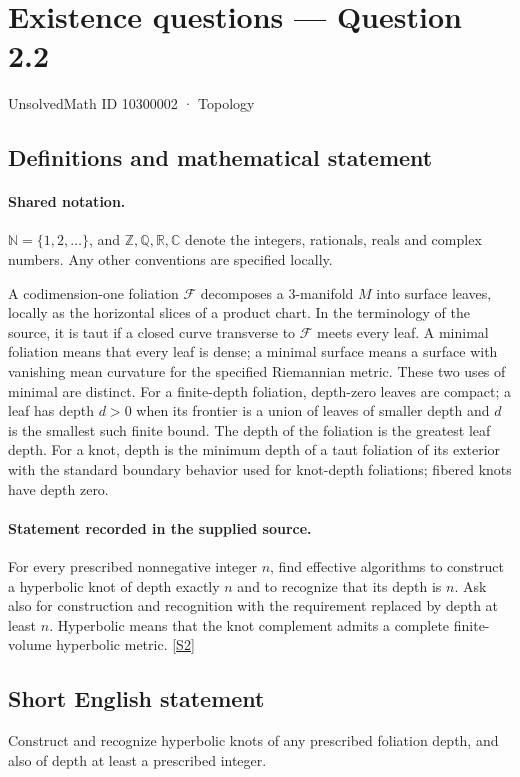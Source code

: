 \documentclass[11pt]{article}
\newcommand{\sref}[2]{\hyperlink{source:#1:#2}{[S#2]}}
\begin{document}
\setcounter{section}{10300001}
\section{Existence questions — Question 2.2}\label{10300002}
{\small\sffamily UnsolvedMath ID 10300002 · Topology}
\subsection{Definitions and mathematical statement}

\paragraph{Shared notation.}$\mathbb N=\{1,2,\ldots\}$, and $\mathbb Z,\mathbb Q,\mathbb R,\mathbb C$ denote the integers, rationals, reals and complex numbers. Any other conventions are specified locally.


A codimension-one foliation $\mathcal F$ decomposes a $3$-manifold $M$ into surface leaves, locally as the horizontal slices of a product chart. In the terminology of the source, it is taut if a closed curve transverse to $\mathcal F$ meets every leaf. A minimal foliation means that every leaf is dense; a minimal surface means a surface with vanishing mean curvature for the specified Riemannian metric. These two uses of minimal are distinct. For a finite-depth foliation, depth-zero leaves are compact; a leaf has depth $d>0$ when its frontier is a union of leaves of smaller depth and $d$ is the smallest such finite bound. The depth of the foliation is the greatest leaf depth. For a knot, depth is the minimum depth of a taut foliation of its exterior with the standard boundary behavior used for knot-depth foliations; fibered knots have depth zero.
\paragraph{Statement recorded in the supplied source.}
For every prescribed nonnegative integer $n$, find effective algorithms to construct a hyperbolic knot of depth exactly $n$ and to recognize that its depth is $n$. Ask also for construction and recognition with the requirement replaced by depth at least $n$. Hyperbolic means that the knot complement admits a complete finite-volume hyperbolic metric. \sref{10300002}{2}
\subsection{Short English statement}
Construct and recognize hyperbolic knots of any prescribed foliation depth, and also of depth at least a prescribed integer.
\end{document}
